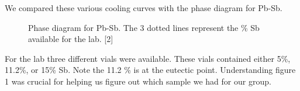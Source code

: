 \documentclass{article}
\begin{document}
We compared these various cooling curves with the phase diagram for Pb-Sb.
\begin{figure}[H]
\centering
{}
\caption{Phase diagram for Pb-Sb. The 3 dotted lines represent the \% Sb available for the lab. [2]}
\end{figure}
\label{fig:phased}
For the lab three different vials were available. These vials contained either 5\%, 11.2\%, or 15\% Sb. Note the 11.2 \% is at the eutectic point. Understanding figure 1 was crucial for helping us figure out which sample we had for our group.
\end{document}
